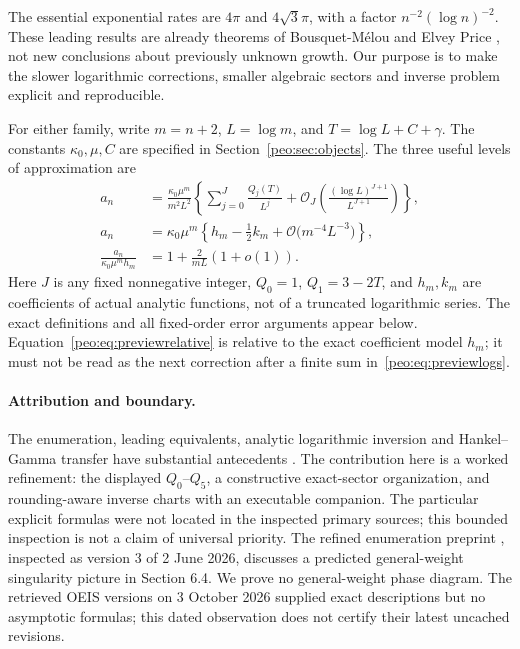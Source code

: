 \documentclass[11pt]{article}
\numberwithin{equation}{section}
\theoremstyle{remark}\newtheorem{remark}[theorem]{Remark}
\newcommand{\Oh}{\mathcal O}
\begin{document}
The essential exponential rates are $4\pi$ and $4\sqrt3\pi$, with a factor $n^{-2}(\log n)^{-2}$. These leading results are already theorems of Bousquet-M\'elou and Elvey Price \cite{BMEP}, not new conclusions about previously unknown growth. Our purpose is to make the slower logarithmic corrections, smaller algebraic sectors and inverse problem explicit and reproducible.

For either family, write $m=n+2$, $L=\log m$, and $T=\log L+C+\gamma$. The constants $\kappa_0,\mu,C$ are specified in Section~\ref{peo:sec:objects}. The three useful levels of approximation are
\begin{align}
 a_n&=\frac{\kappa_0\mu^m}{m^2L^2}
 \left\{\sum_{j=0}^J\frac{Q_j(T)}{L^j}
 +\Oh_J\!\left(\frac{(\log L)^{J+1}}{L^{J+1}}\right)\right\},
 \label{peo:eq:previewlogs}\\
 a_n&=\kappa_0\mu^m\left\{h_m-\frac12 k_m
 +\Oh\bigl(m^{-4}L^{-3}\bigr)\right\},\label{peo:eq:previewmodels}\\
 \frac{a_n}{\kappa_0\mu^m h_m}
 &=1+\frac{2}{mL}(1+o(1)).\label{peo:eq:previewrelative}
\end{align}
Here $J$ is any fixed nonnegative integer, $Q_0=1$, $Q_1=3-2T$, and $h_m,k_m$ are coefficients of actual analytic functions, not of a truncated logarithmic series. The exact definitions and all fixed-order error arguments appear below. Equation~\eqref{peo:eq:previewrelative} is relative to the exact coefficient model $h_m$; it must not be read as the next correction after a finite sum in~\eqref{peo:eq:previewlogs}.

\paragraph{Attribution and boundary.}
The enumeration, leading equivalents, analytic logarithmic inversion and Hankel--Gamma transfer have substantial antecedents \cite{BMEP,BC,EPG,DLMF}. The contribution here is a worked refinement: the displayed $Q_0$--$Q_5$, a constructive exact-sector organization, and rounding-aware inverse charts with an executable companion. The particular explicit formulas were not located in the inspected primary sources; this bounded inspection is not a claim of universal priority. The refined enumeration preprint \cite{refined}, inspected as version 3 of 2 June 2026, discusses a predicted general-weight singularity picture in Section 6.4. We prove no general-weight phase diagram. The retrieved OEIS versions on 3 October 2026 supplied exact descriptions but no asymptotic formulas; this dated observation does not certify their latest uncached revisions.
\end{document}
